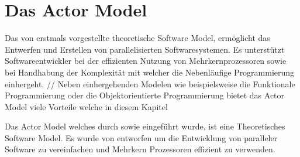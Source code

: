 \chapter{Das Actor Model}
Das von \cite{hewitt1973session} erstmals vorgestellte theoretische Software Model, ermöglicht das Entwerfen und Erstellen von parallelisierten Softwaresystemen. Es unterstützt Softwareentwickler bei der effizienten Nutzung von Mehrkernprozessoren sowie bei Handhabung der  Komplexität mit welcher die Nebenläufige Programmierung einhergeht.   //
Neben einhergehenden Modelen wie beispielsweise die Funktionale Programmierung oder die Objektorientierte Programmierung bietet das Actor Model viele Vorteile welche in diesem Kapitel 


Das Actor Model welches durch \cite{hewitt1973session} sowie \cite{Agha1985ActorsSystems} eingeführt wurde, ist eine Theoretisches Software Model. 
Es wurde von \cite{hewitt1973session} entworfen um die Entwicklung von paralleler Software zu vereinfachen und Mehrkern Prozessoren effizient zu verwenden.